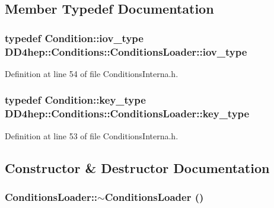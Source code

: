 \subsection{Member Typedef Documentation}
\hypertarget{class_d_d4hep_1_1_conditions_1_1_conditions_loader_a5647851492a3b1469208473fe6d96329}{
\subsubsection[{iov\_\-type}]{\setlength{\rightskip}{0pt plus 5cm}typedef {\bf Condition::iov\_\-type} {\bf DD4hep::Conditions::ConditionsLoader::iov\_\-type}}}
\label{class_d_d4hep_1_1_conditions_1_1_conditions_loader_a5647851492a3b1469208473fe6d96329}


Definition at line 54 of file ConditionsInterna.h.\hypertarget{class_d_d4hep_1_1_conditions_1_1_conditions_loader_ac77fe60ee60373d61aed19b200949c93}{
\subsubsection[{key\_\-type}]{\setlength{\rightskip}{0pt plus 5cm}typedef {\bf Condition::key\_\-type} {\bf DD4hep::Conditions::ConditionsLoader::key\_\-type}}}
\label{class_d_d4hep_1_1_conditions_1_1_conditions_loader_ac77fe60ee60373d61aed19b200949c93}


Definition at line 53 of file ConditionsInterna.h.

\subsection{Constructor \& Destructor Documentation}
\hypertarget{class_d_d4hep_1_1_conditions_1_1_conditions_loader_aabdcec15084838715825303678ba3e69}{
\subsubsection[{$\sim$ConditionsLoader}]{\setlength{\rightskip}{0pt plus 5cm}ConditionsLoader::$\sim$ConditionsLoader ()}}
\label{class_d_d4hep_1_1_conditions_1_1_conditions_loader_aabdcec15084838715825303678ba3e69}


